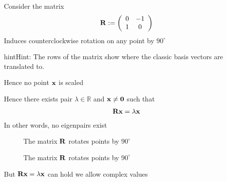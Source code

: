 \documentclass[letterpaper,10pt,english]{jupyterBook}
\begin{document}
\sphinxAtStartPar
Consider the matrix
\begin{equation*}
\begin{split}
%
{\bf R} := 
\left(
\begin{array}{cc}
0 & -1 \\
1 & 0 \\
\end{array}
\right)
%
\end{split}
\end{equation*}
\sphinxAtStartPar
Induces counter\sphinxhyphen{}clockwise rotation on any point by \(90^{\circ}\)

\begin{sphinxadmonition}{hint}{Hint:}
\sphinxAtStartPar
The rows of the matrix show where the classic basis vectors are translated to.
\end{sphinxadmonition}

\sphinxAtStartPar
Hence no point \({\bf x}\) is scaled

\sphinxAtStartPar
Hence there exists  pair \(\lambda \in \mathbb{R}\) and \({\bf x} \ne
{\bf 0}\)
such that
\begin{equation*}
\begin{split}{\bf R} {\bf x} = \lambda {\bf x}\end{split}
\end{equation*}
\sphinxAtStartPar
In other words, no  eigenpairs exist

\begin{figure}[htbp]
\centering
\capstart

\noindent{}
\caption{The matrix \({\bf R}\) rotates points by \(90^{\circ}\)}\label{\detokenize{05.linear_algebra:id18}}\end{figure}

\begin{figure}[htbp]
\centering
\capstart

\noindent{}
\caption{The matrix \({\bf R}\) rotates points by \(90^{\circ}\)}\label{\detokenize{05.linear_algebra:id19}}\end{figure}

\sphinxAtStartPar
But \({\bf R} {\bf x} = \lambda {\bf x}\) can hold  we allow
complex values
\end{document}
